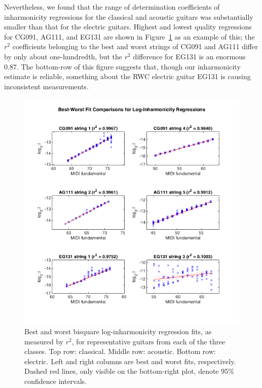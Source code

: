 \documentclass[12pt]{cmuthesis}
\begin{document}
Nevertheless, we found that the range of determination coefficients of inharmonicity regressions for the classical and acoustic guitars was substantially smaller than that for the electric guitars. Highest and lowest quality regressions for CG091, AG111, and EG131 are shown in Figure~\ref{fig:best-worst-r2} as an example of this; the $r^2$ coefficients belonging to the best and worst strings of CG091 and AG111 differ by only about one-hundredth, but the $r^2$ difference for EG131 is an enormous $0.87$. The bottom-row of this figure suggests that, though our inharmonicity estimate is reliable, something about the RWC electric guitar EG131 is causing inconsistent measurements.

\begin{figure}[!htbp] 
\centering
\includegraphics[scale=0.75]{best-worst-r2}
\caption{Best and worst bisquare log-inharmonicity regression fits, as measured by $r^2$, for representative guitars from each of the three classes. Top row: classical. Middle row: acoustic. Bottom row: electric. Left and right columns are best and worst fits, respectively. Dashed red lines, only visible on the bottom-right plot, denote 95\% confidence intervals.}
\label{fig:best-worst-r2}
\end{figure}
\end{document}
